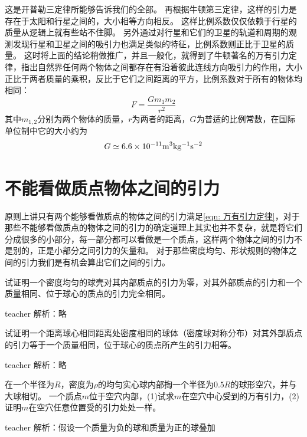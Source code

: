 这是开普勒三定律所能够告诉我们的全部。
再根据牛顿第三定律，这样的引力是存在于太阳和行星之间的，大小相等方向相反。
这样比例系数仅仅依赖于行星的质量从逻辑上就有些站不住脚。
另外通过对行星和它们的卫星的轨道和周期的观测发现行星和卫星之间的吸引力也满足类似的特征，比例系数则正比于卫星的质量。
这时将上面的结论稍做推广，并且一般化，就得到了牛顿著名的万有引力定律，指出自然界任何两个物体之间都存在有沿着彼此连线方向吸引力的作用，大小正比于两者质量的乘积，反比于它们之间距离的平方，比例系数对于所有的物体均相同：
\begin{equation}\label{eqn: 万有引力定律}
F = \frac{Gm_1m_2}{r^2}
\end{equation}
其中$m_{1,2}$分别为两个物体的质量，$r$为两者的距离，$G$为普适的比例常数，在国际单位制中它的大小约为
\begin{equation}
G\simeq 6.6\times 10^{-11}{\rm{m^3kg^{-1}s^{-2}}}
\end{equation}

\section{不能看做质点物体之间的引力}
原则上讲只有两个能够看做质点的物体之间的引力满足\ref{eqn: 万有引力定律}，对于那些不能够看做质点的物体之间的引力的确定道理上其实也并不复杂，就是将它们分成很多的小部分，每一部分都可以看做是一个质点，这样两个物体之间的引力不是别的，正是小部分之间引力的矢量和。
对于那些密度均匀、形状规则的物体之间的引力我们是有机会算出它们之间的引力。

\begin{example}
试证明一个密度均匀的球壳对其内部质点的引力为零，对其外部质点的引力和一个质量相同、位于球心的质点的引力完全相同。
\begin{taggedblock}{teacher}
\newline
解析：略
\end{taggedblock}
\end{example}

\begin{example}
试证明一个距离球心相同距离处密度相同的球体（密度球对称分布）对其外部质点的引力等于一个质量相同，位于球心的质点所产生的引力相等。
\begin{taggedblock}{teacher}
\newline
解析：略
\end{taggedblock}
\end{example}

\begin{example}
在一个半径为$R$，密度为$\rho$的均匀实心球内部掏一个半径为$0.5R$的球形空穴，并与大球相切。
一个质点$m$位于空穴内部，(1)试求$m$在空穴中心受到的万有引力，(2)证明$m$在空穴任意位置受的引力处处一样。
\begin{taggedblock}{teacher}
\newline
解析：假设一个质量为负的球和质量为正的球叠加
\end{taggedblock}
\end{example}



